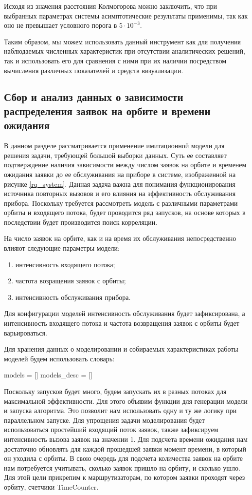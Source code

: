 Исходя из значения расстояния Колмогорова можно заключить, что при выбранных параметрах системы асимптотические результаты применимы, так как оно не превышает условного порога в $5\cdot 10^{-3}$.

Таким образом, мы можем использовать данный инструмент как для получения наблюдаемых численных характеристик при отсутствии аналитических решений, так и использовать его для сравнения с ними при их наличии посредством вычисления различных показателей и средств визуализации.

\subsection{Сбор и анализ данных о зависимости распределения заявок на орбите и времени ожидания}
В данном разделе рассматривается применение имитационной модели для решения задачи, требующей большой выборки данных. Суть ее составляет подтверждение наличия зависимости между числом заявок на орбите и временем ожидания заявки до ее обслуживания на приборе в системе, изображенной на рисунке \ref{rq_system}. Данная задача важна для понимания функционирования источника повторных вызовов и его влияния на эффективность обслуживания прибора. Поскольку требуется рассмотреть модель с различными параметрами орбиты и входящего потока, будет проводится ряд запусков, на основе которых в последствии будет производится поиск корреляции.

На число заявок на орбите, как и на время их обслуживания непосредственно влияют следующие параметры модели:
\begin{enumerate}
	\item интенсивность входящего потока;
	\item частота возращения заявок с орбиты;
	\item интенсивность обслуживания прибора.
\end{enumerate} 

Для конфигурации моделей интенсивность обслуживания будет зафиксирована, а интенсивность входящего потока и частота возвращения заявок с орбиты будет варьироваться.

Для хранения данных о моделировании и собираемых характеристиках работы моделей будем использовать словарь:
\begin{pyin} 
models = []
models_desc = []
\end{pyin}

Поскольку запусков будет много, будем запускать их в разных потоках для максимальной эффективности. Для этого объявим функции для генерации модели и запуска алгоритма. Это позволит нам использовать одну и ту же логику при параллельном запуске. Для упрощения задачи моделирования будет использоваться простейший входящий поток заявок, также зафиксируем интенсивность вызова заявок на значении 1. Для подсчета времени ожидания нам достаточно обновлять для каждой прошедшей заявки момент времени, в который он уходила с орбиты. В свою очередь для подсчета количества заявок на орбите нам потребуется учитывать, сколько заявок пришло на орбиту, и сколько ушло. Для этой цели прикрепим к маршрутизаторам, по котором заявки проходят через орбиту, счетчики TimeCounter.

